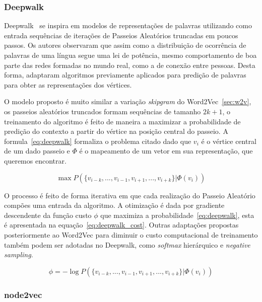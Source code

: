 \subsubsection{Deepwalk}

Deepwalk~\cite{perozzi14} se inspira em modelos de representações de palavras
utilizando como entrada sequências de iterações de Passeios Aleatórios truncadas
em poucos passos.
Os autores observaram que assim como a distribuição de ocorrência de palavras de
uma língua segue uma lei de potência, mesmo comportamento de boa parte das redes
formadas no mundo real, como a de conexão entre pessoas.
Desta forma, adaptaram algoritmos previamente aplicados para predição de
palavras para obter as representações dos vértices.

O modelo proposto é muito similar a variação \textit{skipgram} do
Word2Vec~\ref{sec:w2v}, os passeios aleatórios truncados formam sequências de
tamanho $2k + 1$, o treinamento do algoritmo é feito de maneira a maximizar a
probabilidade de predição do contexto a partir do vértice na posição central do
passeio.
A formula~\ref{eq:deepwalk} formaliza o problema citado dado que $v_i$ é o
vértice central de um dado passeio e $\Phi$ é o mapeamento de um vetor em sua
representação, que queremos encontrar.

\begin{equation} \label{eq:deepwalk}
    \operatorname{max} P(\{v_{i-k},...,v_{i-1},v_{i+1},...,v_{i+k}\}|\Phi(v_i))
\end{equation}

O processo é feito de forma iterativa em que cada realização do Passeio
Aleatório compões uma entrada da algoritmo.
A otimização é dada por gradiente descendente da função custo $\phi$ que maximiza
a probabilidade~\ref{eq:deepwalk}, esta é apresentada na
equação~\ref{eq:deepwalk_cost}.
Outras adaptações propostas posteriormente ao Word2Vec para diminuir o custo
computacional de treinamento também podem ser adotadas no Deepwalk, como
\textit{softmax} hierárquico e \textit{negative sampling}.

\begin{equation} \label{eq:deepwalk_cost}
    \phi = -\log P(\{v_{i-k},...,v_{i-1},v_{i+1},...,v_{i+k}\}|\Phi(v_i))
\end{equation}

\subsubsection{node2vec}

